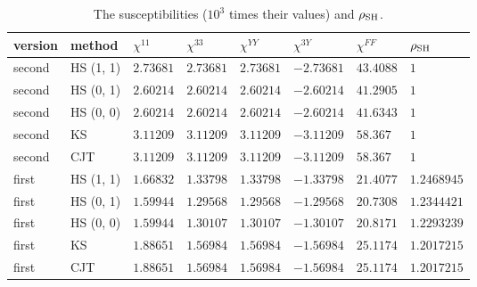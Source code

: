 \documentclass[aps,prd,onecolumn,superscriptaddress,nofootinbib,floatfix,longbibliography]{revtex4-2}
\newcommand{\SH}{{\rm SH}}
\begin{document}
\begin{table}[!htbp]
\caption{\label{tab:chi}The susceptibilities ($10^3$ times their values) and $\rho_\SH$.}
\begingroup\centering\footnotesize\setlength{\tabcolsep}{4pt}
\begin{tabular}{llllllll}
\hline\hline
version & method & $\chi^{11}$ & $\chi^{33}$ & $\chi^{YY}$ & $\chi^{3Y}$ & $\chi^{FF}$ & $\rho_{\rm SH}$ \\ \hline
second & HS (1, 1) & $2.73681$ & $2.73681$ & $2.73681$ & $-2.73681$ & $43.4088$ & $1$ \\
second & HS (0, 1) & $2.60214$ & $2.60214$ & $2.60214$ & $-2.60214$ & $41.2905$ & $1$ \\
second & HS (0, 0) & $2.60214$ & $2.60214$ & $2.60214$ & $-2.60214$ & $41.6343$ & $1$ \\
second & KS & $3.11209$ & $3.11209$ & $3.11209$ & $-3.11209$ & $58.367$ & $1$ \\
second & CJT & $3.11209$ & $3.11209$ & $3.11209$ & $-3.11209$ & $58.367$ & $1$ \\
first & HS (1, 1) & $1.66832$ & $1.33798$ & $1.33798$ & $-1.33798$ & $21.4077$ & $1.2468945$ \\
first & HS (0, 1) & $1.59944$ & $1.29568$ & $1.29568$ & $-1.29568$ & $20.7308$ & $1.2344421$ \\
first & HS (0, 0) & $1.59944$ & $1.30107$ & $1.30107$ & $-1.30107$ & $20.8171$ & $1.2293239$ \\
first & KS & $1.88651$ & $1.56984$ & $1.56984$ & $-1.56984$ & $25.1174$ & $1.2017215$ \\
first & CJT & $1.88651$ & $1.56984$ & $1.56984$ & $-1.56984$ & $25.1174$ & $1.2017215$ \\
\hline\hline
\end{tabular}\par
\endgroup
\end{table}
\end{document}

